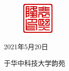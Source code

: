 \documentclass[supercite]{HustGraduPaper}
\begin{document}
\begin{thankpage}




	



	
	\begin{figure}[htb]
		\raggedleft
		\includegraphics[width=16mm]{Figures/Seal-pxl.pdf}
	\end{figure}

	\begin{flushright}
		2021年5月20日

		于华中科技大学韵苑
	\end{flushright}
	
\end{thankpage}


\end{document}
